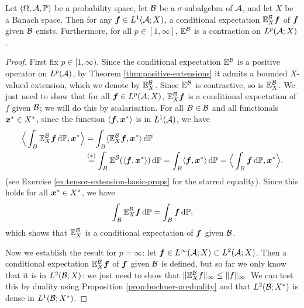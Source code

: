 \begin{prop}
  Let $(\Omega,\mathcal{A},\mathbb{P})$ be a probability space, let $\mathcal{B}$ be a $\sigma$-subalgebra of $\mathcal{A}$, and let $X$ be a Banach space.
  Then for any $\bm{f} \in L^1(\mathcal{A};X)$, a conditional expectation $\mathbb{E}_X^{\mathcal{B}}\bm{f}$ of $\bm{f}$ given $\mathcal{B}$ exists.
  Furthermore, for all $p \in [1,\infty]$, $\mathbb{E}^{\mathcal{B}}$ is a contraction on $L^p(\mathcal{A};X)$.
\end{prop}


\begin{proof}  
  First fix $p \in [1,\infty)$.
  Since the conditional expectation $\mathbb{E}^{\mathcal{B}}$ is a positive operator on $L^p(\mathcal{A})$, by Theorem \ref{thm:positive-extensions} it admits a bounded $X$-valued extension, which we denote by $\mathbb{E}_X^{\mathcal{B}}$.
  Since $\mathbb{E}^{\mathcal{B}}$ is contractive, so is $\mathbb{E}_X^{\mathcal{B}}$.
  We just need to show that for all $\bm{f} \in L^p(\mathcal{A};X)$, $\mathbb{E}_X^{\mathcal{B}}\bm{f}$ is a conditional expectation of $f$ given $\mathcal{B}$; we will do this by scalarisation.
  For all $B \in \mathcal{B}$ and all functionals $\bm{x}^* \in X^*$, since the function $\langle \bm{f}, \bm{x}^* \rangle$ is in $L^1(\mathcal{A})$, we have
  \begin{equation*}
    \begin{aligned}
      \Big\langle \int_B \mathbb{E}_X^{\mathcal{B}} \bm{f} \, \mathrm{d}\mathbb{P}, \bm{x}^* \Big\rangle
      &= \int_B \langle \mathbb{E}_X^{\mathcal{B}} \bm{f}, \bm{x}^* \rangle \, \mathrm{d}\mathbb{P} \\
      &\stackrel{(*)}{=} \int_B \mathbb{E}^{\mathcal{B}} (\langle \bm{f}, \bm{x}^* \rangle) \, \mathrm{d}\mathbb{P}
      = \int_B \langle \bm{f}, \bm{x}^* \rangle \, \mathrm{d}\mathbb{P}
      = \Big\langle \int_B \bm{f} \, \mathrm{d}\mathbb{P}, \bm{x}^* \Big\rangle.
    \end{aligned}
  \end{equation*}
  (see Exercise \ref{ex:tensor-extension-basic-props} for the starred equality).
  Since this holds for all $\bm{x}^* \in X^*$, we have
  \begin{equation*}
     \int_B \mathbb{E}_X^{\mathcal{B}} \bm{f} \, \mathrm{d}\mathbb{P} = \int_B \bm{f} \, \mathrm{d}\mathbb{P},
   \end{equation*}
   which shows that $\mathbb{E}_X^{\mathcal{B}}$ is a conditional expectation of $\bm{f}$ given $\mathcal{B}$.

   Now we establish the result for $p = \infty$: let $\bm{f} \in L^\infty(\mathcal{A};X) \subset L^2(\mathcal{A};X)$.
   Then a conditional expectation $\mathbb{E}_X^{\mathcal{B}} \bm{f}$ of $\bm{f}$ given $\mathcal{B}$ is defined, but so far we only know that it is in $L^2(\mathcal{B};X)$: we just need to show that $\|\mathbb{E}_X^{\mathcal{B}} f\|_\infty \leq \|f\|_\infty$.
   We can test this by duality using Proposition \ref{prop:bochner-preduality} and that $L^2(\mathcal{B}; X^*)$ is dense in $L^1( \mathcal{B}; X^*)$.
   

\end{proof}
